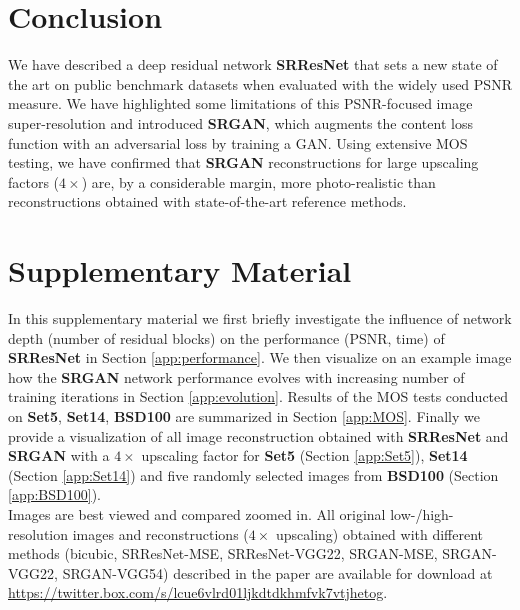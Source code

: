 \documentclass[10pt,twocolumn,letterpaper]{article}
\begin{document}
\section{Conclusion}
\label{sec:conclusion}
We have described a deep residual network \textbf{SRResNet} that sets a new state of the art on public benchmark datasets when evaluated with the widely used \ac{PSNR} measure. We have highlighted some limitations of this \ac{PSNR}-focused image super-resolution and introduced \textbf{SRGAN}, which augments the content loss function with an adversarial loss by training a \ac{GAN}. Using extensive \ac{MOS} testing, we have confirmed that \textbf{SRGAN} reconstructions for large upscaling factors ($4\times$) are, by a considerable margin, more photo-realistic than reconstructions obtained with state-of-the-art reference methods.

{\footnotesize


}
\clearpage
\setcounter{section}{0}
\renewcommand{\thesection}{\Alph{section}}
\onecolumn
\section{Supplementary Material}
In this supplementary material we first briefly investigate the influence of network depth (number of residual blocks) on the performance (PSNR, time) of \textbf{SRResNet} in Section \ref{app:performance}. We then visualize on an example image how the \textbf{SRGAN} network performance evolves with increasing number of training iterations in Section \ref{app:evolution}. Results of the \ac{MOS} tests conducted on \textbf{Set5}, \textbf{Set14}, \textbf{BSD100} are summarized in Section \ref{app:MOS}. Finally we provide a visualization of all image reconstruction obtained with \textbf{SRResNet} and \textbf{SRGAN} with a $4\times$ upscaling factor for \textbf{Set5} (Section \ref{app:Set5}), \textbf{Set14} (Section \ref{app:Set14}) and five randomly selected images from \textbf{BSD100} (Section \ref{app:BSD100}).\\

Images are best viewed and compared zoomed in. All original low-/high-resolution images and reconstructions ($4\times$ upscaling) obtained with different methods (bicubic, SRResNet-MSE, SRResNet-VGG22, SRGAN-MSE, SRGAN-VGG22, SRGAN-VGG54) described in the paper are available for download at \url{https://twitter.box.com/s/lcue6vlrd01ljkdtdkhmfvk7vtjhetog}.

\clearpage
\end{document}
